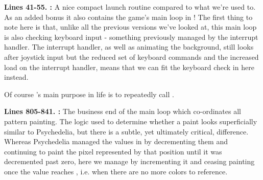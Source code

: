 \textbf{Lines 41-55. :} A nice compact launch routine compared to what we're used to. As an added
bonus it also contains the game's main loop in ! The first thing to note here is that, unlike all the previous
versions we've looked at, this main loop is also checking keyboard input - something previously managed by the interrupt handler. The
interrupt handler, as well as animating the background, still looks after joystick input but the reduced set of keyboard commands and
the increased load on the interrupt handler, means that we can fit the keyboard check in here instead.

Of course 's main purpose in life is to repeatedly call .

\bigskip
\bigskip
\bigskip
\bigskip
\bigskip

\textbf{Lines 805-841. :} The business end of the main loop which co-ordinates
all pattern painting. The logic used to determine whether a paint looks superficially similar to Psychedelia, but there is
a subtle, yet ultimately critical, difference. Whereas Psychedelia managed the values 
in by decrementing them and continuing to paint the pixel represented by that
position until it was decremented past zero, here we manage  by incrementing
it and ceasing painting once the value reaches , i.e. when there are no more colors to reference.


